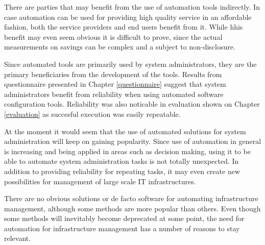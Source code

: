 There are parties that may benefit from the use of automation tools indirectly.
In case automation can be used for providing high quality service in an
affordable fashion, both the service providers and end users benefit from it.
While hhis benefit may even seem obvious it is difficult to prove, since the
actual measurements on savings can be complex and a subject to non-disclosure.

Since automated tools are primarily used by system administrators, they are the
primary beneficiaries from the development of the tools. Results from
questionnaire presented in Chapter \ref{questionnaire} suggest that system
administrators benefit from reliability when using automated software
configuration tools. Reliability was also noticable in evaluation shown on
Chapter \ref{evaluation} as succesful execution was easily repeatable.

At the moment it would seem that the use of automated solutions for system
administration will keep on gaining popularity. Since use of automation in
general is increasing and being applied in areas such as decision making, using
it to be able to automate system administration tasks is not totally
unexpected. In addition to providing reliability for repeating tasks, it may
even create new possibilities for management of large scale IT infrastructures.

There are no obvious solutions or de facto software for automating
infrastructure management, although some methods are more popular than others.
Even though some methods will inevitably become deprecated at some point, the
need for automation for infrastructure management has a number of reasons to
stay relevant.
